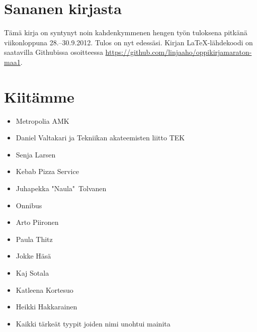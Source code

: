 \section*{Sananen kirjasta}

Tämä kirja on syntynyt noin kahdenkymmenen hengen työn tuloksena pitkänä viikonloppuna 28.--30.9.2012. Tulos on nyt edessäsi. Kirjan \LaTeX-lähdekoodi on saatavilla Githubissa osoitteessa \url{https://github.com/linjaaho/oppikirjamaraton-maa1}.



\section*{Kiitämme}
\begin{itemize}
\item Metropolia AMK
\item Daniel Valtakari ja Tekniikan akateemisten liitto TEK
\item Senja Larsen
\item Kebab Pizza Service
\item Juhapekka "Naula"\ Tolvanen
\item Onnibus
\item Arto Piironen
\item Paula Thitz
\item Jokke Häsä
\item Kaj Sotala
\item Katleena Kortesuo
\item Heikki Hakkarainen
\item Kaikki tärkeät tyypit joiden nimi unohtui mainita
\end{itemize}


